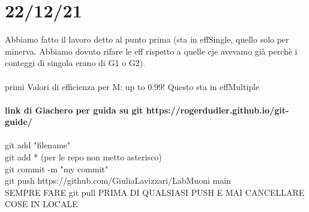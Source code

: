 \documentclass{article}
\begin{document}
\section{22/12/21}
Abbiamo fatto il lavoro detto al punto prima (sta in effSingle, quello solo per minerva. Abbiamo dovuto rifare le eff rispetto a quelle cje avevamo già perchè i conteggi di singola erano di G1 o G2).\\\\
primi Valori di efficienza per M: up to 0.99! Questo sta in effMultiple\\\\
\textbf{link di Giachero per guida su git https://rogerdudler.github.io/git-guide/}\\\\
git add "filename"\\
git add * (per le repo non metto asterisco)\\
git commit -m "my commit"\\
git push https://github.com/GiuliaLavizzari/LabMuoni main\\
SEMPRE FARE git pull PRIMA DI QUALSIASI PUSH E MAI CANCELLARE COSE IN LOCALE\\
\end{document}
